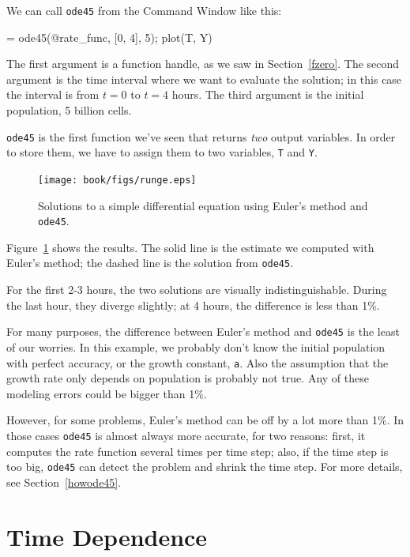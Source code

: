 We can call {\tt ode45} from the Command Window like this:

\begin{code}
[T, Y] = ode45(@rate_func, [0, 4], 5);
plot(T, Y)
\end{code}

The first argument is a function handle, as we saw in Section~\ref{fzero}.  The second argument is the time interval where we want to evaluate the solution; in this case the interval is from $t=0$ to $t=4$ hours.  The third argument is the initial population, 5 billion cells.


{\tt ode45} is the first function we've seen that returns {\em two} output variables.  In order to store them, we have to assign them to two variables, {\tt T} and {\tt Y}.

\begin{figure}[ht]
\centerline{\texttt{[image: book/figs/runge.eps]}}
\caption{Solutions to a simple differential equation using Euler's method and {\tt ode45}.}
\label{fig:runge}
\end{figure}

Figure~\ref{fig:runge} shows the results.  The solid line is the estimate we computed with Euler's method; the dashed line is the solution from {\tt ode45}.

For the first 2-3 hours, the two solutions are visually indistinguishable.  During the last hour, they diverge slightly; at 4 hours, the difference is less than 1\%.

For many purposes, the difference between Euler's method and {\tt ode45} is the least of our worries.  In this example, we probably don't know the initial population with perfect accuracy, or the growth constant, {\tt a}.  Also the assumption that the growth rate only depends on population is probably not true.  Any of these modeling errors could be bigger than 1\%.

However, for some problems, Euler's method can be off by a lot more than 1\%.  In those cases {\tt ode45} is almost always more accurate, for two reasons: first, it computes the rate function several times per time step; also, if the time step is too big, {\tt ode45} can detect the problem and shrink the time step.  For more details, see Section~\ref{howode45}.


\section{Time Dependence}

